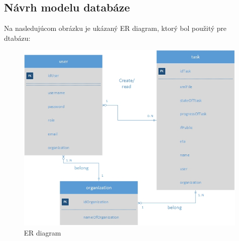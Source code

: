 \subsection{Návrh modelu databáze}
Na nasledujúcom obrázku je ukázaný ER diagram, ktorý bol použitý pre dtabázu:
\begin{figure}[htb]

\begin{center}

\includegraphics[scale=0.5]{ER.jpg} 
\caption{ER diagram}
\label{ER}

\end{center}

\end{figure}

